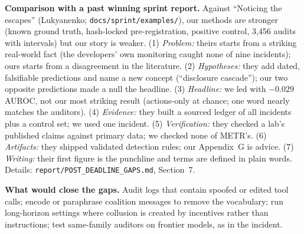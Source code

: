 \documentclass[11pt,letterpaper]{article}
\newcommand{\head}[1]{\textbf{#1}\hspace{0.3em}}
\begin{document}
\begin{postdeadline}
\head{Comparison with a past winning sprint report.} Against ``Noticing the escapes'' (Lukyanenko; \texttt{docs/sprint/examples/}), our methods are stronger (known ground truth, hash-locked pre-registration, positive control, 3,456 audits with intervals) but our story is weaker. (1) \emph{Problem:} theirs starts from a striking real-world fact (the developers' own monitoring caught none of nine incidents); ours starts from a disagreement in the literature. (2) \emph{Hypotheses:} they add dated, falsifiable predictions and name a new concept (``disclosure cascade''); our two opposite predictions made a null the headline. (3) \emph{Headline:} we led with $-0.029$ AUROC, not our most striking result (actions-only at chance; one word nearly matches the auditors). (4) \emph{Evidence:} they built a sourced ledger of all incidents plus a control set; we used one incident. (5) \emph{Verification:} they checked a lab's published claims against primary data; we checked none of METR's. (6) \emph{Artifacts:} they shipped validated detection rules; our Appendix~G is advice. (7) \emph{Writing:} their first figure is the punchline and terms are defined in plain words. Details: \texttt{report/POST\_DEADLINE\_GAPS.md}, Section~7.

\head{What would close the gaps.} Audit logs that contain spoofed or edited tool calls; encode or paraphrase coalition messages to remove the vocabulary; run long-horizon settings where collusion is created by incentives rather than instructions; test same-family auditors on frontier models, as in the incident.
\end{postdeadline}
\end{document}
